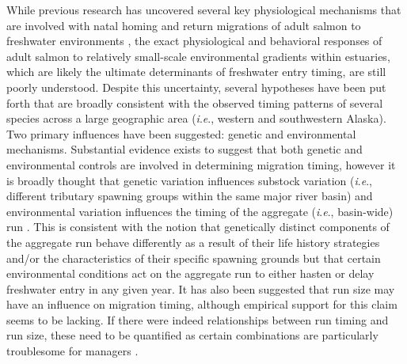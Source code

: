 \documentclass[12pt,]{book}
\theoremstyle{definition}
\theoremstyle{definition}
\theoremstyle{definition}
\theoremstyle{remark}
\begin{document}
While previous research has uncovered several key physiological
mechanisms that are involved with natal homing
\citep{hasler-scholz-1983} and return migrations of adult salmon to
freshwater environments
\citep{cooke-etal-2008, cooperman-etal-2010, hinch-etal-2012}, the exact
physiological and behavioral responses of adult salmon to relatively
small-scale environmental gradients within estuaries, which are likely
the ultimate determinants of freshwater entry timing, are still poorly
understood. Despite this uncertainty, several hypotheses have been put
forth that are broadly consistent with the observed timing patterns of
several species across a large geographic area (\emph{i}.\emph{e}.,
western and southwestern Alaska). Two primary influences have been
suggested: genetic
\citep{anderson-beer-2009, omalley-etal-2010, quinn-etal-2000} and
environmental \citep{hodgson-etal-2006, keefer-etal-2008} mechanisms.
Substantial evidence exists to suggest that both genetic and
environmental controls are involved in determining migration timing,
however it is broadly thought that genetic variation influences substock
variation (\emph{i}.\emph{e}., different tributary spawning groups
within the same major river basin) and environmental variation
influences the timing of the aggregate (\emph{i}.\emph{e}., basin-wide)
run \citep{anderson-beer-2009, keefer-etal-2008}. This is consistent
with the notion that genetically distinct components of the aggregate
run behave differently as a result of their life history strategies
and/or the characteristics of their specific spawning grounds
\citetext{\citealp[\emph{e}.\emph{g}., substocks that must travel
farther in-river to reach spawning grounds enter freshwater
earlier;][]{clark-etal-2015}; \citealp[substocks that spawn in
tributaries influenced by warmer lakes enable later
spawning;][]{burger-etal-1985}} but that certain environmental
conditions act on the aggregate run to either hasten or delay freshwater
entry in any given year. It has also been suggested that run size may
have an influence on migration timing, although empirical support for
this claim seems to be lacking. If there were indeed relationships
between run timing and run size, these need to be quantified as certain
combinations are particularly troublesome for managers
\citep[\emph{e}.\emph{g}., small/early runs and large/late runs appear
the same early in-season;][]{adkison-cunningham-2015}.
\end{document}

